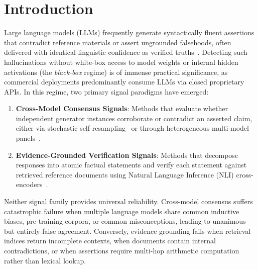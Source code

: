 \documentclass[pdflatex,sn-mathphys,Numbered]{sn-jnl}
\begin{document}

\maketitle

\section{Introduction}\label{sec:intro}

Large language models (LLMs) frequently generate syntactically fluent assertions that contradict reference materials or assert ungrounded falsehoods, often delivered with identical linguistic confidence as verified truths~\cite{ji2023survey}. Detecting such hallucinations without white-box access to model weights or internal hidden activations (the \emph{black-box} regime) is of immense practical significance, as commercial deployments predominantly consume LLMs via closed proprietary APIs. In this regime, two primary signal paradigms have emerged:
\begin{enumerate}
    \item \textbf{Cross-Model Consensus Signals}: Methods that evaluate whether independent generator instances corroborate or contradict an asserted claim, either via stochastic self-resampling~\cite{manakul2023selfcheckgpt} or through heterogeneous multi-model panels~\cite{chen2024beacon}.
    \item \textbf{Evidence-Grounded Verification Signals}: Methods that decompose responses into atomic factual statements and verify each statement against retrieved reference documents using Natural Language Inference (NLI) cross-encoders~\cite{min2023factscore,dhuliawala2023chain}.
\end{enumerate}

Neither signal family provides universal reliability. Cross-model consensus suffers catastrophic failure when multiple language models share common inductive biases, pre-training corpora, or common misconceptions, leading to unanimous but entirely false agreement. Conversely, evidence grounding fails when retrieval indices return incomplete contexts, when documents contain internal contradictions, or when assertions require multi-hop arithmetic computation rather than lexical lookup.
\end{document}
